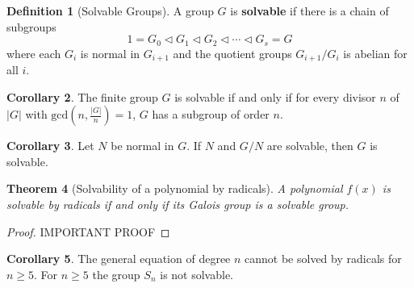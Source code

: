 \documentclass[10pt, oneside, reqno]{amsart}
\theoremstyle{plain}%
\newtheorem{thm}{Theorem}[section]
\theoremstyle{definition}
\newtheorem{defn}[thm]{Definition}
\newtheorem{cor}[thm]{Corollary}
\theoremstyle{remark}
\begin{document}
\begin{defn}[Solvable Groups]
	A group $G$ is \textbf{solvable} if there is a chain of subgroups\[
		1 = G_0 \lhd G_1 \lhd G_2 \lhd \cdots \lhd G_s = G
	\] where each $G_i$ is normal in $G_{i+1}$ and the quotient groups $G_{i+1}/G_i$ is abelian for all $i$.
\end{defn}

\begin{cor}
	The finite group $G$ is solvable if and only if for every divisor $n$ of $|G|$ with $\text{gcd}(n, \frac{|G|}{n}) = 1$, $G$ has a subgroup of order $n$.
\end{cor}

\begin{cor} Let $N$ be normal in $G$.
	If $N$ and $G/N$ are solvable, then $G$ is solvable.
\end{cor}

\begin{thm}[Solvability of a polynomial by radicals]
	A polynomial $f(x)$ is solvable by radicals if and only if its Galois group is a solvable group.
\end{thm}

\begin{proof}
	IMPORTANT PROOF
\end{proof}

\begin{cor}
	The general equation of degree $n$ cannot be solved by radicals for $n \geq 5$.  For $n \geq 5$ the group $S_n$ is not solvable.
\end{cor}
\end{document}

